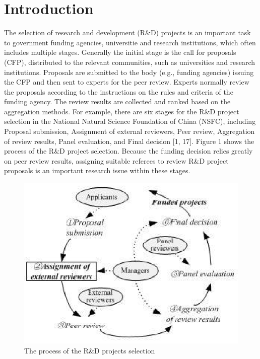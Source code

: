 \documentclass{elsarticle}
\begin{document}
\section{Introduction}
\label{sec:introduction}
The selection of research and development (R\&D) projects is an
important task to government funding agencies, universitie and 
research institutions, which often includes multiple
stages. Generally  the initial stage is the call for proposals (CFP), distributed to the relevant communities, such as universities and research institutions.
Proposals are submitted to the body (e.g., funding agencies) issuing
the CFP and then sent to experts for the peer review. Experts normally
review the proposals according to the instructions on the rules and
criteria of the funding agency. The review results are collected and
ranked based on the aggregation methods. For example, there are six
stages for the R\&D project selection in the National Natural Science
Foundation of China (NSFC), including Proposal submission, Assignment
of external reviewers, Peer review, Aggregation of review results,
Panel evaluation, and Final decision [1, 17]. Figure 1 shows the
process of the R\&D project selection. Because the funding decision
relies greatly on peer review results, assigning suitable referees
to review R\&D project proposals is an important research issue within
these stages.
\begin{figure}
  \centering
   \includegraphics{figures/1.eps}
  \caption{The process of the R\&D projects selection}

\end{figure}
\end{document}
